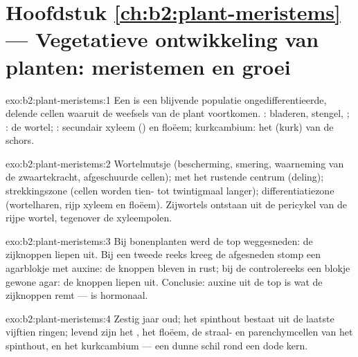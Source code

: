 \section*{Hoofdstuk \ref{ch:b2:plant-meristems} --- Vegetatieve ontwikkeling van planten: meristemen en groei}

\begin{solution}{exo:b2:plant-meristems:1}
Een  is een blijvende populatie ongedifferentieerde, delende
cellen waaruit de weefsels van de plant voortkomen. : bladeren, stengel, ; : de
wortel; : secundair xyleem () en floëem; kurkcambium: het
 (kurk) van de schors.
\end{solution}

\begin{solution}{exo:b2:plant-meristems:2}
Wortelmutsje (bescherming, smering, waarneming van de zwaartekracht,
afgeschuurde cellen);  met het rustende centrum (deling);
strekkingszone (cellen worden tien- tot twintigmaal langer);
differentiatiezone (wortelharen, rijp xyleem en floëem). Zijwortels
ontstaan uit de pericykel van de rijpe wortel, tegenover de xyleempolen.
\end{solution}

\begin{solution}{exo:b2:plant-meristems:3}
Bij bonenplanten werd de top weggesneden: de zijknoppen liepen uit. Bij een
tweede reeks kreeg de afgesneden stomp een agarblokje met auxine: de
knoppen bleven in rust; bij de controlereeks een blokje gewone agar: de
knoppen liepen uit. Conclusie: auxine uit de top is wat de zijknoppen remt
---  is hormonaal.
\end{solution}

\begin{solution}{exo:b2:plant-meristems:4}
Zestig jaar oud; het spinthout bestaat uit de laatste vijftien ringen;
levend zijn het , het floëem, de straal- en parenchymcellen van het
spinthout, en het kurkcambium --- een dunne schil rond een dode kern.
\end{solution}

